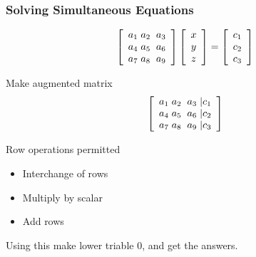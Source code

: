   \begin{frame}[fragile]\frametitle{Solving Simultaneous Equations}
$$ \left[ \begin{array}{ccc} a_1 \hspace{1mm} a_2 \hspace{1mm} \hspace{1mm} a_3 \\
                              a_4 \hspace{1mm} a_5 \hspace{1mm} \hspace{1mm} a_6 \\
                             a_7 \hspace{1mm} a_8 \hspace{1mm} \hspace{1mm} a_9\end{array}  \right]   
                             \left[ \begin{array}{c} x \\ y\\z\end{array}  \right] 
                =  \left[ \begin{array}{c} c_1\\ c_2  \\ c_3              \end{array}  \right]                $$
                
Make augmented matrix
$$ \left[ \begin{array}{cccc} a_1 \hspace{1mm} a_2 \hspace{1mm} \hspace{1mm} a_3  \hspace{1mm} |c_1\\
                              a_4 \hspace{1mm} a_5 \hspace{1mm} \hspace{1mm} a_6  \hspace{1mm} |c_2 \\
                             a_7 \hspace{1mm} a_8 \hspace{1mm} \hspace{1mm} a_9  \hspace{1mm} |c_3 \end{array}  \right]   $$

Row operations permitted
\begin{itemize}
\item Interchange of rows
\item Multiply by scalar
\item Add rows
\end{itemize}     
Using this make lower triable 0, and get the answers.           
\end{frame}

